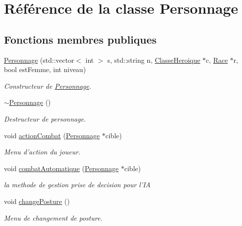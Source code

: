 \hypertarget{classPersonnage}{\section{Référence de la classe Personnage}
\label{classPersonnage}
}
\subsection*{Fonctions membres publiques}
\begin{DoxyCompactItemize}
\item 
\hyperlink{classPersonnage_af67a53c849a176a4dd642bb6b634833e}{Personnage} (std\-::vector$<$ int $>$ s, std\-::string n, \hyperlink{classClasseHeroique}{Classe\-Heroique} $\ast$c, \hyperlink{classRace}{Race} $\ast$r, bool est\-Femme, int niveau)
\begin{DoxyCompactList}\small\item\em Constructeur de \hyperlink{classPersonnage}{Personnage}. \end{DoxyCompactList}\item 
\hyperlink{classPersonnage_a05bdf2a469885bb1fbb6c2e8f98972ab}{$\sim$\-Personnage} ()
\begin{DoxyCompactList}\small\item\em Destructeur de personnage. \end{DoxyCompactList}\item 
void \hyperlink{classPersonnage_ac1a65837596032eba2af5a4b9309b114}{action\-Combat} (\hyperlink{classPersonnage}{Personnage} $\ast$cible)
\begin{DoxyCompactList}\small\item\em Menu d'action du joueur. \end{DoxyCompactList}\item 
void \hyperlink{classPersonnage_a56baf3c31093afa4f232c6ca0d434d6c}{combat\-Automatique} (\hyperlink{classPersonnage}{Personnage} $\ast$cible)
\begin{DoxyCompactList}\small\item\em la methode de gestion prise de decision pour l'I\-A \end{DoxyCompactList}\item 
void \hyperlink{classPersonnage_ae9f35f04c2e15c98d97db9675d531d46}{change\-Posture} ()
\begin{DoxyCompactList}\small\item\em Menu de changement de posture. \end{DoxyCompactList}\item 

\end{DoxyCompactItemize}
